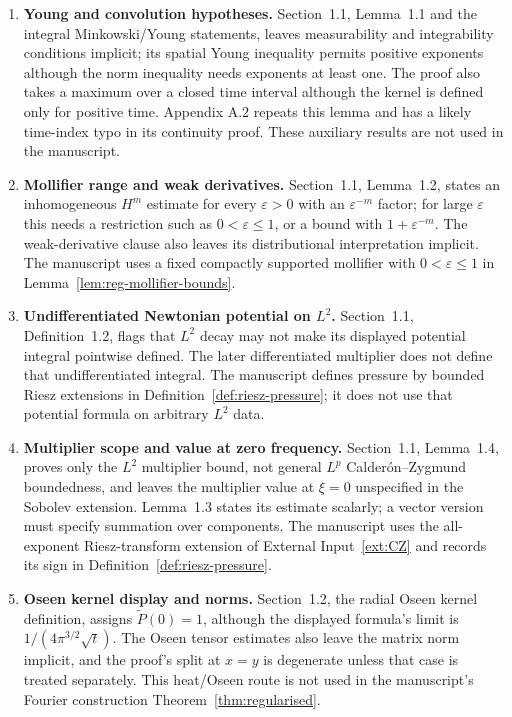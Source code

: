 \documentclass[11pt,reqno]{amsart}
\begin{document}
\begin{enumerate}
\item \textbf{Young and convolution hypotheses.} Section~1.1, Lemma~1.1 and the integral Minkowski/Young statements, leaves measurability and integrability conditions implicit; its spatial Young inequality permits positive exponents although the norm inequality needs exponents at least one. The proof also takes a maximum over a closed time interval although the kernel is defined only for positive time. Appendix A.2 repeats this lemma and has a likely time-index typo in its continuity proof. These auxiliary results are not used in the manuscript.

\item \textbf{Mollifier range and weak derivatives.} Section~1.1, Lemma~1.2, states an inhomogeneous \(H^m\) estimate for every \(\varepsilon>0\) with an \(\varepsilon^{-m}\) factor; for large \(\varepsilon\) this needs a restriction such as \(0<\varepsilon\le1\), or a bound with \(1+\varepsilon^{-m}\). The weak-derivative clause also leaves its distributional interpretation implicit. The manuscript uses a fixed compactly supported mollifier with \(0<\varepsilon\le1\) in Lemma~\ref{lem:reg-mollifier-bounds}.

\item \textbf{Undifferentiated Newtonian potential on \(L^2\).} Section~1.1, Definition~1.2, flags that \(L^2\) decay may not make its displayed potential integral pointwise defined. The later differentiated multiplier does not define that undifferentiated integral. The manuscript defines pressure by bounded Riesz extensions in Definition~\ref{def:riesz-pressure}; it does not use that potential formula on arbitrary \(L^2\) data.

\item \textbf{Multiplier scope and value at zero frequency.} Section~1.1, Lemma~1.4, proves only the \(L^2\) multiplier bound, not general \(L^p\) Calderón--Zygmund boundedness, and leaves the multiplier value at \(\xi=0\) unspecified in the Sobolev extension. Lemma~1.3 states its estimate scalarly; a vector version must specify summation over components. The manuscript uses the all-exponent Riesz-transform extension of External Input~\ref{ext:CZ} and records its sign in Definition~\ref{def:riesz-pressure}.

\item \textbf{Oseen kernel display and norms.} Section~1.2, the radial Oseen kernel definition, assigns \(\widetilde P(0)=1\), although the displayed formula's limit is \(1/(4\pi^{3/2}\sqrt t)\). The Oseen tensor estimates also leave the matrix norm implicit, and the proof's split at \(x=y\) is degenerate unless that case is treated separately. This heat/Oseen route is not used in the manuscript's Fourier construction Theorem~\ref{thm:regularised}.


\end{enumerate}
\end{document}
